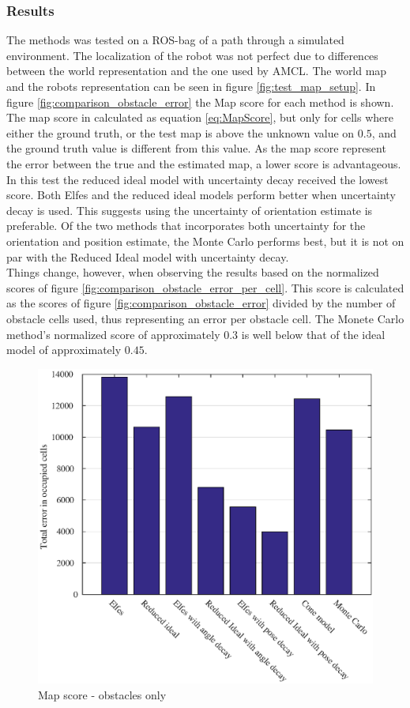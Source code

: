 \subsubsection{Results}
The methods was tested on a ROS-bag of a path through a simulated environment. 
The localization of the robot was not perfect due to differences between the world representation and the one used by AMCL.
The world map and the robots representation can be seen in figure \vref{fig:test_map_setup}.
In figure \vref{fig:comparison_obstacle_error} the Map score for each method is shown. The map score in calculated as equation \vref{eq:MapScore}, but only for cells where either the ground truth, or the test map is above the unknown value on $0.5$, and the ground truth value is different from this value. As the map score represent the error between the true and the estimated map, a lower score is advantageous. In this test the reduced ideal model with uncertainty decay received the lowest score. Both Elfes and the reduced ideal models perform better when uncertainty decay is used. This suggests using the uncertainty of orientation estimate is preferable. Of the two methods that incorporates both uncertainty for the orientation and position estimate, the Monte Carlo performs best, but it is not on par with the Reduced Ideal model with uncertainty decay.\\
 
Things change, however, when observing the results based on the normalized scores of figure \vref{fig:comparison_obstacle_error_per_cell}. This score is calculated as the scores of figure \vref{fig:comparison_obstacle_error} divided by the number of obstacle cells used, thus representing an error per obstacle cell.
The Monete Carlo method's normalized score of approximately $0.3$ is well below that of the ideal model of approximately $0.45$.

\begin{figure}[htbp]
	\centering
	\includegraphics[scale=1]{figures/static_mapping/comparison_obstacle_error}
	\caption{Map score - obstacles only}
	\label{fig:comparison_obstacle_error}
\end{figure}

